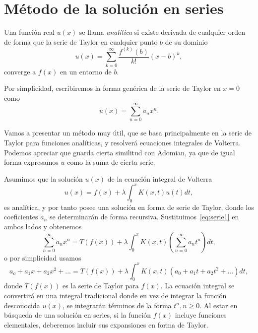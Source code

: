 \section{Método de la solución en series}
\begin{definicion}
	Una función real $u(x)$ se llama \textit{analítica} si existe derivada de cualquier orden de forma que la serie de Taylor en cualquier punto $b$ de su dominio
	\begin{equation}
		u(x) = \sum_{k=0}^{\infty}\dfrac{f^{(k)}(b)}{k!}(x-b)^k,
	\end{equation}
	converge a $f(x)$ en un entorno de $b$.
\end{definicion}
Por simplicidad, escribiremos la forma genérica de la serie de Taylor en $x = 0$ como
\begin{equation}\label{eq:serie1}
	u(x) = \sum_{n=0}^{\infty}a_nx^n.
\end{equation}

Vamos a presentar un método muy útil, que se basa principalmente en la serie de Taylor para funciones analíticas, y resolverá ecuaciones integrales de Volterra. Podemos apreciar que guarda cierta similitud con Adomian, ya que de igual forma expresamos $u$ como la suma de cierta serie.

Asumimos que la solución $u(x)$ de la ecuación integral de Volterra
\begin{equation}
	u(x) = f(x) + \lambda \int_0^x K(x,t)u(t)dt,
\end{equation}
es analítica, y por tanto posee una solución en forma de serie de Taylor, donde los coeficientes $a_n$ se determinarán de forma recursiva. Sustituimos~\eqref{eq:serie1} en ambos lados y obtenemos
\begin{equation}\label{eq:serie2}
	\sum_{n=0}^{\infty}a_nx^n = T(f(x)) + \lambda \int_{0}^{x}K(x,t)(\sum_{n=0}^{\infty}a_nt^n)dt,
\end{equation}
o por simplicidad usamos
\begin{equation}
	a_o + a_1x + a_2x^2 + ... = T(f(x)) + \lambda \int_{0}^{x}K(x,t) (a_0+a_1t+a_2t^2+...)dt,
\end{equation}
donde $T(f(x))$ es la serie de Taylor para $f(x)$. La ecuación integral se convertirá en una integral tradicional donde en vez de integrar la función desconocida $u(x)$, se integrarán términos de la forma $t^n,n\geqslant0$. Al estar en búsqueda de una solución en series, si la función $f(x)$ incluye funciones elementales, deberemos incluir sus expansiones en forma de Taylor.

